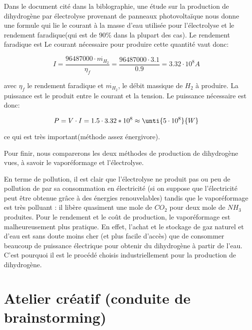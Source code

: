 Dans le document cité dans la biblographie, une étude sur la production
de dihydrogène par électrolyse provenant de panneaux photovoltaïque nous
donne une formule qui lie le courant à la masse d'eau utilisée pour
l'électrolyse et le rendement faradique(qui est de $90\%$ dans la plupart des cas).
Le rendement faradique est Le courant nécessaire pour produire cette quantité vaut donc:

$$I = \frac{96487000\cdot {\dot{m_{H_{2}}}}}{\eta_{f}} = \frac{96487000\cdot 3.1}{0.9} =  \unit{3.32\cdot 10^{8}}{A}$$

avec $\eta_{f}$ le rendement faradique et $\dot{m_{H_{2}}}$, le débit massique
de $H_{2}$ à produire. La puissance est le produit entre le courant et la 
tension. Le puissance nécessaire est donc:

$$P = V\cdot I = 1.5\cdot 3.32*10^{8} \approx \unti{5\cdot 10^{8}}{W}$$

ce qui est très important(méthode assez énergivore).

Pour finir, nous comparerons les deux méthodes de production de 
dihydrogène vues, à savoir le vaporéformage et l'électrolyse.

En terme de pollution, il est clair que l'électrolyse ne produit 
pas ou peu de pollution de par sa consommation en électricité 
(si on suppose que l'électricité peut être obtenue grâce à des énergies renouvelables)
tandis que le vaporéformage est très polluant : il libère quasiment une mole de $CO_{2}$
pour deux mole de $NH_{3}$ produites. Pour le rendement et le coût de production, 
le vaporéformage est malheureusement plus pratique. En effet, l'achat et le stockage
de gaz naturel et d'eau est sans doute moins cher (et plus facile d'accès) que 
de consommer beaucoup de puissance électrique pour obtenir du dihydrogène à partir
de l'eau. C'est pourquoi il est le procédé choisis industriellement pour la production
de dihydrogène.

\section{Atelier créatif (conduite de brainstorming)}


